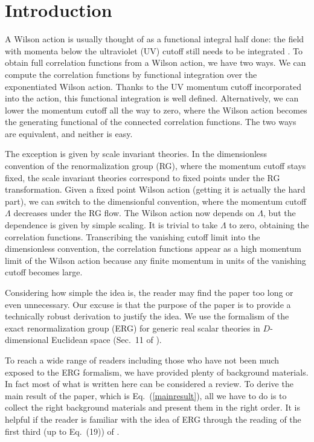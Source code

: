 \documentclass[aps,prd,preprint,groupedaddress,preprintnumbers,longbibliography]{revtex4-1}
\begin{document}
\section{Introduction}

A Wilson action is usually thought of as a functional integral half
done: the field with momenta below the ultraviolet (UV) cutoff still
needs to be integrated \cite{Wilson:1973jj}. To obtain full
correlation functions from a Wilson action, we have two ways.  We can
compute the correlation functions by functional integration over the
exponentiated Wilson action.  Thanks to the UV momentum cutoff
incorporated into the action, this functional integration is well
defined.  Alternatively, we can lower the momentum cutoff all the way
to zero, where the Wilson action becomes the generating functional of
the connected correlation functions.  The two ways are equivalent, and
neither is easy.

The exception is given by scale invariant theories.  In the
dimensionless convention of the renormalization group (RG), where the
momentum cutoff stays fixed, the scale invariant theories correspond
to fixed points under the RG transformation.  Given a fixed point
Wilson action (getting it is actually the hard part), we can switch to
the dimensionful convention, where the momentum cutoff $\Lambda$
decreases under the RG flow.  The Wilson action now depends on
$\Lambda$, but the dependence is given by simple scaling.  It is
trivial to take $\Lambda$ to zero, obtaining the correlation
functions.  Transcribing the vanishing cutoff limit into the
dimensionless convention, the correlation functions appear as a high
momentum limit of the Wilson action because any finite momentum in
units of the vanishing cutoff becomes large.

Considering how simple the idea is, the reader may find the paper too
long or even unnecessary.  Our excuse is that the purpose of the paper
is to provide a technically robust derivation to justify the idea.  We
use the formalism of the exact renormalization group (ERG) for generic
real scalar theories in $D$-dimensional Euclidean space (Sec.~11 of
\cite{Wilson:1973jj}).

To reach a wide range of readers including those who have not been
much exposed to the ERG formalism, we have provided plenty of
background materials.  In fact most of what is written here can be
considered a review.  To derive the main result of the paper, which is
Eq.~(\ref{mainresult}), all we have to do is to collect the right
background materials and present them in the right order.  It is
helpful if the reader is familiar with the idea of ERG through the
reading of the first third (up to Eq.~(19)) of
\cite{Polchinski:1983gv}.
\end{document}
